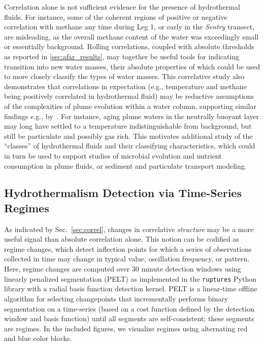 Correlation alone is not sufficient evidence for the presence of hydrothermal fluids. For instance, some of the coherent regions of positive or negative correlation with methane any time during Leg 1, or early in the \emph{Sentry} transect, are misleading, as the overall methane content of the water was exceedingly small or essentially background. Rolling correlations, coupled with absolute thresholds as reported in \cref{sec:afar_results}, may together be useful tools for indicating transition into new water masses, their absolute properties of which could be used to more closely classify the types of water masses. This correlative study also demonstrates that correlations in expectation (e.g., temperature and methane being positively correlated in hydrothermal fluid) may be reductive assumptions of the complexities of plume evolution within a water column, supporting similar findings e.g., by~\cite{cowen2002methane}. For instance, aging plume waters in the neutrally buoyant layer may long have settled to a temperature indistinguishable from background, but still be particulate and possibly gas rich. This motivates additional study of the ``classes'' of hydrothermal fluids and their classifying characteristics, which could in turn be used to support studies of microbial evolution and nutrient consumption in plume fluids, or sediment and particulate transport modeling.

\subsection{Hydrothermalism Detection via Time-Series Regimes}
As indicated by Sec.~\ref{sec:correl}, changes in correlative \emph{structure} may be a more useful signal than absolute correlation alone. This notion can be codified as regime changes, which detect inflection points for which a series of observations collected in time may change in typical value, oscillation frequency, or pattern. Here, regime changes are computed over 30 minute detection windows using linearly penalized segmentation\autocite{killick2012optimal} (PELT) as implemented in the \verb|ruptures| Python library\autocite{truong2020selective} with a radial basis function detection kernel.
PELT is a linear-time offline algorithm for selecting changepoints that incrementally performs binary segmentation on a time-series (based on a cost function defined by the detection window and basis function) until all segments are self-consistent; these segments are regimes. In the included figures, we visualize regimes using alternating red and blue color blocks.

